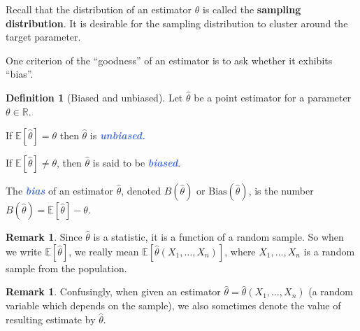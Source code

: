 \documentclass[10pt]{article}
\theoremstyle{definition}
\newtheorem{definition}[theorem]{Definition}
\newtheorem{remark}[theorem]{Remark}
\newcommand{\1}[1]{\textbf{1}_{\left[#1\right]}} %
\def\R{\mathbb{R}} %
\def\E{\mathbb{E}} %
\newcommand{\demph}[1]{\textcolor{RoyalBlue}{\textbf{\slshape #1}}} %
\begin{document}
Recall that the distribution of an estimator $\widehat{\theta}$ is called the
\textbf{sampling distribution}. It is desirable for the sampling distribution
to cluster around the target parameter.

One criterion of the ``goodness'' of an estimator is to ask whether it exhibits ``bias''.

\begin{definition}[Biased and unbiased]
  \label{def:biased-and-unbiased}
  Let $\widehat{\theta}$ be a point estimator for a parameter $\theta\in \R$.

  If $\E\left[\widehat{\theta} \right]=\theta$ then $\widehat{\theta}$ is
  \demph{unbiased.}
  
  If $\E\left[\widehat{\theta} \right]\neq \theta$, then $\widehat{\theta}$ is
  said to be \demph{biased}.

  The \demph{bias} of an estimator $\widehat{\theta}$, denoted
  $B(\widehat{\theta})$ or $\mathrm{Bias}(\widehat{\theta})$, is the number
  $B(\widehat{\theta})= \E[\widehat{\theta} ]-\theta$.
\end{definition}

\begin{remark}
  Since $\widehat{\theta}$ is a statistic, it is a function of a random
  sample. So when we write $\E[\widehat{\theta} ]$, we really mean
  $\E\left[\widehat{\theta}(X_{1},\ldots,X_{n}) \right]$, where
  $X_{1},\ldots,X_{n}$ is a random sample from the population.
\end{remark}

\begin{remark}
  Confusingly, when given an estimator
  $\widehat{\theta}= \widehat{\theta}(X_{1},\ldots,X_{n})$ (a random variable
  which depends on the sample), we also sometimes denote the value of
  resulting estimate by $\widehat{\theta}$.
\end{remark}
\end{document}
